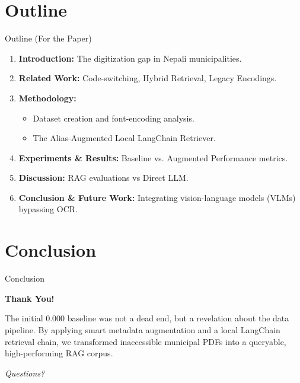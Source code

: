 \documentclass[11pt,aspectratio=169]{beamer}
\begin{document}
\section{Outline}
\begin{frame}{Outline (For the Paper)}
    \begin{enumerate}
        \item \textbf{Introduction:} The digitization gap in Nepali municipalities.
        \item \textbf{Related Work:} Code-switching, Hybrid Retrieval, Legacy Encodings.
        \item \textbf{Methodology:} 
        \begin{itemize}
            \item Dataset creation and font-encoding analysis.
            \item The Alias-Augmented Local LangChain Retriever.
        \end{itemize}
        \item \textbf{Experiments \& Results:} Baseline vs. Augmented Performance metrics.
        \item \textbf{Discussion:} RAG evaluations vs Direct LLM.
        \item \textbf{Conclusion \& Future Work:} Integrating vision-language models (VLMs) bypassing OCR.
    \end{enumerate}
\end{frame}

\section{Conclusion}
\begin{frame}{Conclusion}
    \begin{center}
        \Large \textbf{Thank You!}
        \vspace{0.5cm}
        
        \normalsize
        The initial 0.000 baseline was not a dead end, but a revelation about the data pipeline. By applying smart metadata augmentation and a local LangChain retrieval chain, we transformed inaccessible municipal PDFs into a queryable, high-performing RAG corpus.
        
        \vspace{0.5cm}
        \textit{Questions?}
    \end{center}
\end{frame}
\end{document}
